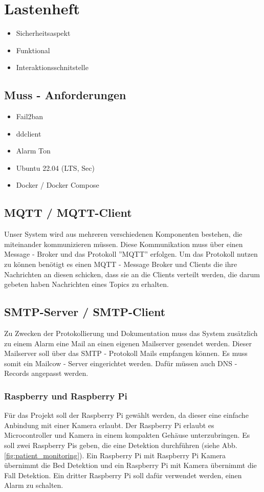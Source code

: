 
\section{Lastenheft}
\begin{itemize}
    \item Sicherheitsaspekt
    \item Funktional 
    \item Interaktionsschnitstelle
\end{itemize}

\subsection{Muss - Anforderungen}
\begin{itemize}
  \item  Fail2ban
  \item ddclient
  \item Alarm Ton
  \item Ubuntu 22.04 (LTS, Sec)
  \item Docker / Docker Compose
\end{itemize}

\subsection{MQTT / MQTT-Client}
Unser System wird aus mehreren verschiedenen Komponenten bestehen, die miteinander kommunizieren müssen. Diese Kommunikation muss über einen Message - Broker und das Protokoll ''MQTT'' \cite{MQTT} erfolgen. Um das Protokoll nutzen zu können benötigt es einen MQTT - Message Broker und Clients die ihre Nachrichten an diesen schicken, dass sie an die Clients verteilt werden, die darum gebeten haben Nachrichten eines Topics zu erhalten. 

\subsection{SMTP-Server / SMTP-Client}
Zu Zwecken der Protokollierung und Dokumentation muss das System zusätzlich zu einem Alarm eine Mail an einen eigenen Mailserver gesendet werden. Dieser Mailserver soll über das SMTP - Protokoll Mails empfangen können. Es muss somit ein Mailcow - Server \cite{Mailcow} eingerichtet werden. Dafür müssen auch DNS - Records angepasst werden. 

\subsubsection{Raspberry und Raspberry Pi} \label{sec:raspi}
Für das Projekt soll der Raspberry Pi gewählt werden, da dieser eine einfache Anbindung mit einer Kamera erlaubt. Der Raspberry Pi erlaubt es Microcontroller und Kamera in einem kompakten Gehäuse unterzubringen.  Es soll zwei Raspberry Pis geben, die eine Detektion  durchführen (siehe Abb. \ref{fig:patient_monitoring}). Ein Raspberry Pi mit Raspberry Pi Kamera übernimmt die Bed Detektion und ein Raspberry Pi mit Kamera übernimmt die Fall Detektion. Ein dritter Raspberry Pi soll  dafür verwendet werden,  einen Alarm zu schalten. 


